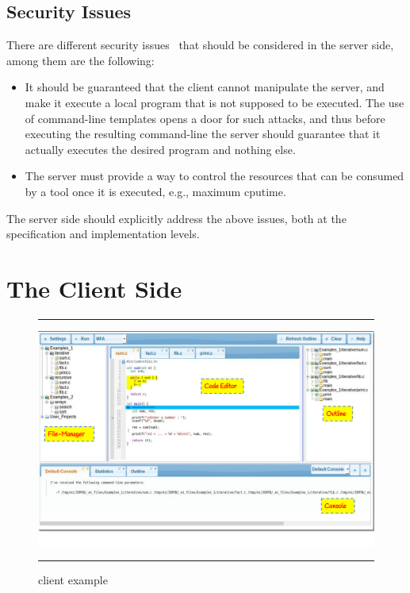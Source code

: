 \subsection{Security Issues}

There are different security issues~\cite{apachesecurity} that should be considered in the
server side, among them are the following:
%
\begin{itemize}
%
\item It should be guaranteed that the client cannot manipulate the
  server, and make it execute a local program that is not supposed to
  be executed. The use of command-line templates opens a door for such
  attacks, and thus before executing the resulting command-line the
  server should guarantee that it actually executes the desired
  program and nothing else.
%
\item The server must provide a way to control the resources that can
  be consumed by a tool once it is executed, e.g., maximum cputime.
\end{itemize}
%
The server side should explicitly address the above issues, both at the
specification and implementation levels.


\section{The Client Side}
\label{sec:architecture:client}

\begin{figure}[t]
\hrule\smallskip
\begin{center}
\includegraphics[width=1\textwidth]{fig/webclient.pdf}
\end{center}
\caption{\ei client example}
\label{fig:arch:client}
\hrule
\end{figure}


